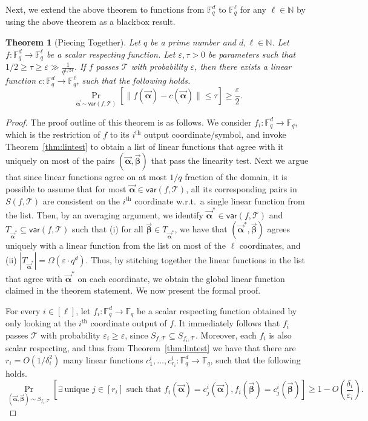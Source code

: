 \documentclass[10pt,a4paper]{article}
\newcommand{\F}{\mathbb{F}}
\renewcommand{\ge}{ \geqslant}
\renewcommand{\le}{ \leqslant}
\newtheorem{theorem}{Theorem}[section]
\renewcommand{\epsilon}{\varepsilon}
\newcommand{\alphab}{\vec{\bm{\alpha}}}
\newcommand{\betab}{\vec{\bm{\beta}}}
\newcommand{\var}{\mathsf{var}}
\renewcommand{\kappa}{\tau}
\begin{document}
Next, we extend the above theorem to  functions from $\F_q^d$ to $\F_q^\ell$ for any $\ell\in\mathbb{N}$ by using the above theorem as a blackbox result.  

\begin{theorem}[Piecing Together]\label{thm:piecing}
Let $q$ be a prime number and $d,\ell\in \mathbb{N}$. 
Let $f:\F_q^d\to\F_q^{\ell}$ be a scalar respecting function. 
Let $\epsilon, \kappa > 0$ be parameters such that 
$1/2\ge \kappa \ge \epsilon \gg  \frac{1}{q^{1/24}}$. 
If $f$  passes $\mathcal{T}$ with probability $\varepsilon$, then there exists a \emph{linear} function $c:\F_q^d\to\F_q^{\ell}$, such that the following holds.
$$
\underset{\alphab\sim \var(f,\mathcal{T}) }{\Pr}\left[\|f(\alphab)-c(\alphab)\|\le \kappa \right]\ge \frac{\varepsilon}{2}.
$$ 
\end{theorem} 
\begin{proof}
	The proof outline of this theorem is as follows. We consider $f_i:\F_q^d\to\F_q$, which is the restriction of $f$ to its $i^{\text{th}}$ output coordinate/symbol, and invoke Theorem~\ref{thm:lintest} to obtain a list of linear functions that agree with it uniquely on most of the pairs $(\alphab,\betab)$ that pass the linearity test. Next we argue that since linear functions agree on at most $1/q$ fraction of the domain, it is possible to assume that for most $\alphab\in \var(f,\mathcal{T})$, all its corresponding pairs in $S(f,\mathcal{T})$ are consistent on the $i^{\text{th}}$  coordinate w.r.t.\ a single linear function from the list. Then, by an averaging argument, we identify $\alphab^*\in \var(f,\mathcal{T})$ and $T_{\alphab^*}\subseteq \var(f,\mathcal{T})$ such that (i) for all $\betab\in T_{\alphab^*}$, we have that $(\alphab^*,\betab)$ agrees uniquely with a linear function from the list on most of the $\ell$ coordinates, and (ii) $|T_{\alphab^*} |=\Omega(\varepsilon\cdot  q^d)$. Thus, by stitching together the linear functions in the list that agree with $\alphab^*$ on each coordinate, we obtain the global linear function claimed in the theorem statement.  We now present the formal proof.
	
	
	 For every $i\in[\ell]$, let $f_i:\F_q^d\to\F_q$ be a scalar respecting function obtained by only looking at the $i^{\text{th}}$ coordinate output of $f$. It immediately follows that  
	$f_i$ passes $\mathcal{T}$ with probability $\varepsilon_i\ge \varepsilon$, since $S_{f,\mathcal{T}}\subseteq S_{f_i,\mathcal{T}}$. Moreover, each $f_i$ is also scalar respecting, and thus from Theorem~\ref{thm:lintest} we have that there are  $r_i = O(1/\delta_i^2)$ many linear functions $c_1^i,\ldots ,c_{r_i}^i:\F_q^d\to\F_q$,  such that the following holds.
	$$
	\underset{ (\alphab, \betab) \sim S_{f_i,\mathcal{T}} }{\Pr}\left[\exists\ \text{unique } j\in[r_i] \text{ such that }f_i(\alphab)=c_j^i(\alphab),
	f_i(\betab)=c_j^i(\betab) \right]\ge 1- O\left(\frac{\delta_i}{\epsilon_i}\right).
	$$
	

\end{proof}
\end{document}
